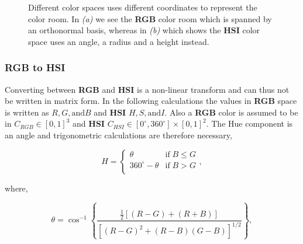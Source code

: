 \begin{figure}[H]
    \centering
    \captionsetup[subfigure]{justification=centering}
    \begin{subfigure}[b]{0.49\textwidth}
        \centering
        
		\caption{}
		\label{fig:color_coordinate_rgb}
    \end{subfigure}
    \begin{subfigure}[b]{0.49\textwidth}
        \centering
        
		\caption{}
		\label{fig:color_coordinate_hsi}
    \end{subfigure}
    \caption{Different color spaces uses different coordinates to represent the color room. In \textit{(a)} we see the \textbf{RGB} color room which is spanned by an orthonormal basis, whereas in \textit{(b)} which shows the \textbf{HSI} color space uses an angle, a radius and a height instead.}
    \label{fig:color_coordinate}
\end{figure}

\subsubsection{\textbf{RGB} to \textbf{HSI}}

Converting between \textbf{RGB} and \textbf{HSI} is a non-linear transform and can thus not be written in matrix form. In the following calculations the values in \textbf{RGB} space is written as $R, G, \text{and} B$ and \textbf{HSI} $H, S, \text{and} I$. Also a \textbf{RGB} color is assumed to be in $C_{RGB} \in [0,1]^3$ and \textbf{HSI} $C_{HSI} \in [0^{\circ},360^{\circ}]\times[0,1]^2$. The Hue component is an angle and trigonometric calculations are therefore necessary,

\begin{equation}
H = \left\{\begin{array}{ll}
\theta & \text{if}\; B \leq G \\
360^{\circ} - \theta & \text{if}\; B > G\\
\end{array}\right.,
\end{equation}

where,

\begin{equation}
\theta = \cos^{-1}{\left\{\frac{\frac{1}{2}\left[(R-G)+(R+B)\right]}{\left[(R-G)^2+(R-B)(G-B)\right]^{1/2}}\right\}},
\end{equation}

